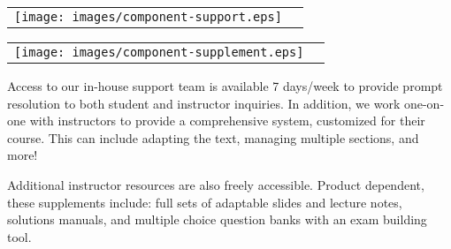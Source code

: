 \vspace{2em}

\begin{multicols}{2}
\begin{center}
\begin{lscshdrbox}
\begin{tabu}{X[1,c,m] X[2,l,m]}
\vspace{0pt}
\texttt{[image: images/component-support.eps]}
&
\vspace{0pt}
\textcolor{white}{\textbf{\fontsize{14}{20}\selectfont {SUPPORT}}}
\end{tabu}
\end{lscshdrbox}
\end{center}

\columnbreak

\begin{center}
\begin{lscshdrbox}
\begin{tabu}{X[1,c,m] X[2,l,m]}
\vspace{0pt}
\texttt{[image: images/component-supplement.eps]}
&
\vspace{0pt}
\textcolor{white}{\textbf{\fontsize{14}{20}\selectfont {INSTRUCTOR SUPPLEMENTS}}}
\end{tabu}
\end{lscshdrbox}
\end{center}
\end{multicols}



\begin{multicols}{2}
\parbox{1.0\linewidth}{
	Access to our in-house support team is available 7 days/week to provide prompt resolution to both student and instructor inquiries. In addition, we work one-on-one with instructors to provide a comprehensive system, customized for their course. This can include adapting the text, managing multiple sections, and more!
	}

\columnbreak
	\parbox{1.0\linewidth}{
Additional instructor resources are also freely accessible. Product dependent, these supplements include: full sets of adaptable slides and lecture notes, solutions manuals, and multiple choice question banks with an exam building tool.
	}
\end{multicols}

\vfill

\begin{center}
	\textcolor{lscstextcolour}{\textbf{\fontsize{18}{22}\selectfont {Contact Lyryx Today!}}} \\
\medskip
\textcolor{lyryxcolour}{\textbf{\fontsize{14}{18}\selectfont {info@lyryx.com}}} \\

\end{center}

\vfill


\setlength{\parskip}{\baselineskip}
\setlength{\columnsep}{10pt}
